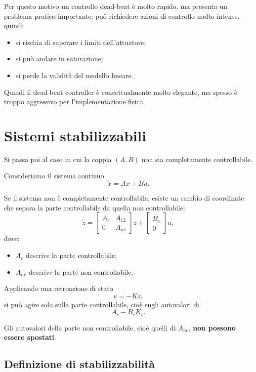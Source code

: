 Per questo motivo un controllo dead-beat è molto rapido, ma presenta un problema pratico importante:
può richiedere azioni di controllo molto intense, quindi
\begin{itemize}
    \item si rischia di superare i limiti dell'attuatore;
    \item si può andare in saturazione;
    \item si perde la validità del modello lineare.
\end{itemize}

Quindi il dead-beat controller è concettualmente molto elegante,
ma spesso è troppo aggressivo per l'implementazione fisica.

\section{Sistemi stabilizzabili}

Si passa poi al caso in cui la coppia \((A,B)\) non sia completamente controllabile.

Consideriamo il sistema continuo
\[
\dot x=Ax+Bu.
\]

Se il sistema non è completamente controllabile, esiste un cambio di coordinate che separa
la parte controllabile da quella non controllabile:
\[
\dot z=
\begin{bmatrix}
A_c & A_{12}\\
0 & A_{nc}
\end{bmatrix}z
+
\begin{bmatrix}
B_c\\
0
\end{bmatrix}u,
\]
dove:
\begin{itemize}
    \item \(A_c\) descrive la parte controllabile;
    \item \(A_{nc}\) descrive la parte non controllabile.
\end{itemize}

Applicando una retroazione di stato
\[
u=-Kz,
\]
si può agire solo sulla parte controllabile, cioè sugli autovalori di
\[
A_c-B_cK_c.
\]

Gli autovalori della parte non controllabile, cioè quelli di \(A_{nc}\), \textbf{non possono essere spostati}.

\subsection{Definizione di stabilizzabilità}

